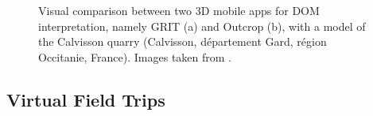 \documentclass[review]{elsarticle}
\begin{document}
\begin{figure}[htbp]
\begin{center}
	 	\begin{minipage}{\columnwidth}
	 		\centering
	 	\end{minipage}
	\caption{Visual comparison between two 3D mobile apps for \gls{DOM} interpretation, namely \gls{GRIT} (a) and Outcrop (b), with a model of the Calvisson quarry (Calvisson, d\'{e}partement Gard, r\'{e}gion Occitanie, France). Images taken from \cite{Kehl2017_PhDThesis}.}
	\label{fig:field_geology}
\end{center}
\end{figure}

\subsection{Virtual Field Trips}
\label{sec:applications:virtual_field_trip}

%
%
\end{document}

